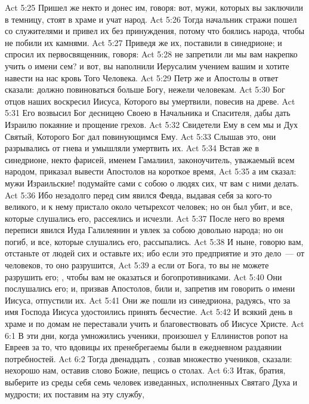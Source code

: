 \vs Act 5:25 Пришел же некто и донес им, говоря: вот, мужи, которых вы заключили в темницу, стоят в храме и учат народ.
\vs Act 5:26 Тогда начальник стражи пошел со служителями и привел их без принуждения, потому что боялись народа, чтобы не побили их камнями.
\vs Act 5:27 Приведя же их, поставили в синедрионе; и спросил их первосвященник, говоря:
\vs Act 5:28 не запретили ли мы вам накрепко учить о имени сем? и вот, вы наполнили Иерусалим учением вашим и хотите навести на нас кровь Того Человека.
\vs Act 5:29 Петр же и Апостолы в ответ сказали: должно повиноваться больше Богу, нежели человекам.
\vs Act 5:30 Бог отцов наших воскресил Иисуса, Которого вы умертвили, повесив на древе.
\vs Act 5:31 Его возвысил Бог десницею Своею в Начальника и Спасителя, дабы дать Израилю покаяние и прощение грехов.
\vs Act 5:32 Свидетели Ему в сем мы и Дух Святый, Которого Бог дал повинующимся Ему.
\rsbpar\vs Act 5:33 Слышав это, они разрывались от гнева и умышляли умертвить их.
\vs Act 5:34 Встав же в синедрионе, некто фарисей, именем Гамалиил, законоучитель, уважаемый всем народом, приказал вывести Апостолов на короткое время,
\vs Act 5:35 а им сказал: мужи Израильские! подумайте сами с собою о людях сих, чт вам с ними делать.
\vs Act 5:36 Ибо незадолго перед сим явился Февда, выдавая себя за кого-то великого, и к нему пристало около четырехсот человек; но он был убит, и все, которые слушались его, рассеялись и исчезли.
\vs Act 5:37 После него во время переписи явился Иуда Галилеянин и увлек за собою довольно народа; но он погиб, и все, которые слушались его, рассыпались.
\vs Act 5:38 И ныне, говорю вам, отстаньте от людей сих и оставьте их; ибо если это предприятие и это дело~--- от человеков, то оно разрушится,
\vs Act 5:39 а если от Бога, то вы не можете разрушить его; , чтобы вам не оказаться и богопротивниками.
\vs Act 5:40 Они послушались его; и, призвав Апостолов, били  и, запретив им говорить о имени Иисуса, отпустили их.
\vs Act 5:41 Они же пошли из синедриона, радуясь, что за имя Господа Иисуса удостоились принять бесчестие.
\vs Act 5:42 И всякий день в храме и по домам не переставали учить и благовествовать об Иисусе Христе.
\vs Act 6:1 В эти дни, когда умножились ученики, произошел у Еллинистов ропот на Евреев за то, что вдовицы их пренебрегаемы были в ежедневном раздаянии потребностей.
\vs Act 6:2 Тогда двенадцать , созвав множество учеников, сказали: нехорошо нам, оставив слово Божие, пещись о столах.
\vs Act 6:3 Итак, братия, выберите из среды себя семь человек изведанных, исполненных Святаго Духа и мудрости; их поставим на эту службу,

